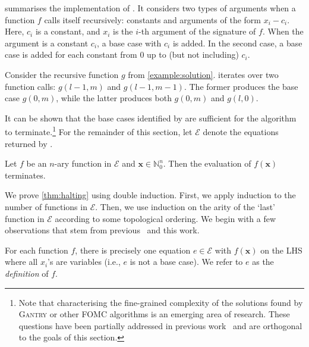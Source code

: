 \documentclass[a4paper,UKenglish,cleveref, autoref, thm-restate]{lipics-v2021}
\newcommand{\Cranetwo}{\textsc{Gantry}}
\begin{document}
 summarises the implementation of \FindBaseCases. It
considers two types of arguments when a function $f$ calls itself recursively:
constants and arguments of the form $x_{i} - c_{i}$. Here, $c_{i}$ is a
constant, and $x_{i}$ is the $i$-th argument of the signature of $f$. When the
argument is a constant $c_{i}$, a base case with $c_{i}$ is added. In the second
case, a base case is added for each constant from $0$ up to (but not including)
$c_{i}$.

\begin{example}
  Consider the recursive function $g$ from \cref{example:solution}.
  \FindBaseCases iterates over two function calls: $g(l-1, m)$ and
  $g(l-1, m-1)$. The former produces the base case $g(0, m)$, while the latter
  produces both $g(0, m)$ and $g(l, 0)$.
\end{example}

It can be shown that the base cases identified by \FindBaseCases are sufficient
for the algorithm to terminate.\footnote{Note that characterising the
  fine-grained complexity of the solutions found by \Cranetwo{} or other FOMC
  algorithms is an emerging area of research. These questions have been
  partially addressed in previous
  work~\cite{DBLP:conf/kr/DilkasB23,DBLP:conf/kr/TothK24}
  and are orthogonal to the goals of this section.} For the remainder of this
section, let $\mathcal{E}$ denote the equations returned by
\CompileWithBaseCases.

\begin{theorem}\label{thm:halting}
  Let $f$ be an $n$-ary function in $\mathcal{E}$ and
  $\mathbf{x} \in \mathbb{N}_{0}^{n}$. Then the evaluation of $f(\mathbf{x})$
  terminates.
\end{theorem}

We prove \cref{thm:halting} using double induction. First, we apply induction to
the number of functions in $\mathcal{E}$. Then, we use induction on the arity of
the `last' function in $\mathcal{E}$ according to some topological ordering. We
begin with a few observations that stem from
previous~\cite{DBLP:conf/kr/DilkasB23,DBLP:conf/ijcai/BroeckTMDR11} and this
work.

\begin{observation}\label{assumption1}
  For each function $f$, there is precisely one equation $e \in \mathcal{E}$
  with $f(\mathbf{x})$ on the LHS where all $x_{i}$'s are variables (i.e., $e$
  is not a base case). We refer to $e$ as the \emph{definition} of $f$.
\end{observation}
\end{document}
